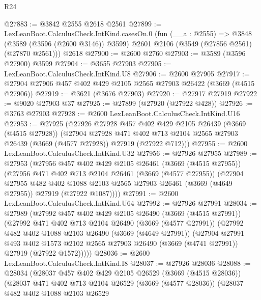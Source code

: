 \begin{lexlean}{R24}
\begin{coremodule}
@27883 := @3842 @2555 @2618 @2561
@27899 := LexLeanBoot.CalculusCheck.IntKind.casesOn.{0}
    (fun (__a : @2555) =>
    @3848 (@3589 (@3596 (@2600 @3146)) @3599) @2601 @2106 (@3549 (@27856 @2561) (@27870 @2561)))
    @2618
@27900 := @2600 @2760
@27903 := @3589 (@3596 @27900) @3599
@27904 := @3655 @27903
@27905 := LexLeanBoot.CalculusCheck.IntKind.U8
@27906 := @2600 @27905
@27917 := @27904 @27906 @457 @402 @429 @2105 @2565 @27903 @26422 (@3669 (@4515 @27906))
@27919 := @3621 (@3676 @27903)
@27920 := @27917 @27919
@27922 := @9020 @27903 @37
@27925 := @27899 (@27920 (@27922 @428))
@27926 := @3763 @27903
@27928 := @2600 LexLeanBoot.CalculusCheck.IntKind.U16
@27953 := @27925
    (@27926
      @27928
      @457
      @402
      @429
      @2105
      @26439
      (@3669 (@4515 @27928))
      (@27904
        @27928
        @471
        @402
        @713
        @2104
        @2565
        @27903
        @26439
        (@3669 (@4577 @27928))
        @27919
        (@27922 @712)))
@27955 := @2600 LexLeanBoot.CalculusCheck.IntKind.U32
@27956 := @27926 @27955
@27989 := @27953
    (@27956
      @457
      @402
      @429
      @2105
      @26461
      (@3669 (@4515 @27955))
      (@27956
        @471
        @402
        @713
        @2104
        @26461
        (@3669 (@4577 @27955))
        (@27904
          @27955
          @482
          @402
          @1088
          @2103
          @2565
          @27903
          @26461
          (@3669 (@4649 @27955))
          @27919
          (@27922 @1087))))
@27991 := @2600 LexLeanBoot.CalculusCheck.IntKind.U64
@27992 := @27926 @27991
@28034 := @27989
    (@27992
      @457
      @402
      @429
      @2105
      @26490
      (@3669 (@4515 @27991))
      (@27992
        @471
        @402
        @713
        @2104
        @26490
        (@3669 (@4577 @27991))
        (@27992
          @482
          @402
          @1088
          @2103
          @26490
          (@3669 (@4649 @27991))
          (@27904
            @27991
            @493
            @402
            @1573
            @2102
            @2565
            @27903
            @26490
            (@3669 (@4741 @27991))
            @27919
            (@27922 @1572)))))
@28036 := @2600 LexLeanBoot.CalculusCheck.IntKind.I8
@28037 := @27926 @28036
@28088 := @28034
    (@28037
      @457
      @402
      @429
      @2105
      @26529
      (@3669 (@4515 @28036))
      (@28037
        @471
        @402
        @713
        @2104
        @26529
        (@3669 (@4577 @28036))
        (@28037
          @482
          @402
          @1088
          @2103
          @26529

\end{coremodule}
\end{lexlean}
